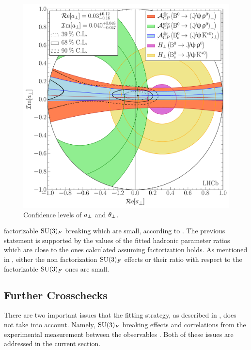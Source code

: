 \begin{figure}[!t]
  \centering
  \includegraphics[trim=0.0cm 0.0cm 0.0cm 0.0cm, clip=true,scale=0.39]{Figures/Chapter5/Penguin_Contribution_Re_vs_Im_allB2VV_Perp_withH.pdf}
  \caption{Confidence levels of $a_{\perp}$ and $\theta_{\perp}$.}
  \label{pengPlot_perp}
\end{figure}

\noindent factorizable $\mathrm{SU}(3)_F$ breaking which are small,
according to \cite{DeBruyn-thesis}. The previous statement is supported by the values of the fitted hadronic parameter
ratios which are close to the ones calculated assuming factorization holds. As mentioned in \cite{DeBruyn-thesis},
either the non factorization $\mathrm{SU}(3)_F$ effects or their ratio with respect to the factorizable $\mathrm{SU}(3)_F$
ones are small.

\subsection{Further Crosschecks}
There are two important issues that the fitting strategy, as described in ,
does not take into account. Namely, $\mathrm{SU}(3)_F$ breaking effects and correlations from the
experimental measurement between the observables . Both of these issues
are addressed in the current section.

